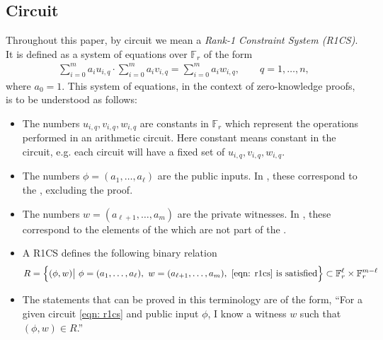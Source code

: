 
\subsection{Circuit}
Throughout this paper, by circuit we mean a \emph{Rank-1 Constraint System (R1CS)}. It is defined as a system of equations over $\mathbb{F}_r$ of the form 
\begin{align}
\sum_{i=0}^m a_i u_{i, q} \cdot \sum_{i=0}^m a_i v_{i, q} = \sum_{i=0}^m a_i w_{i, q}, \qquad q = 1, \dots, n, \label{eqn: r1cs}
\end{align}
where $a_0 = 1$. This system of equations, in the context of zero-knowledge proofs, is to be understood as follows:
\begin{itemize}
\item The numbers $u_{i, q}, v_{i, q}, w_{i, q}$ are constants in $\mathbb{F}_r$ which represent the operations performed in an arithmetic circuit. Here constant means constant in the circuit, e.g. each \MantaPay{} circuit will have a fixed set of $u_{i, q}, v_{i, q}, w_{i, q}$.
\item The numbers $\phi = (a_1, \dots, a_\ell)$ are the public inputs. In \MantaPay{}, these correspond to the \TransferPost{}, excluding the proof.
\item The numbers $w = (a_{\ell + 1}, \dots, a_m)$ are the private witnesses. In \MantaPay{}, these correspond to the elements of the \Transfer{} which are not part of the \TransferPost{}.
\item A R1CS defines the following binary relation
\begin{align}
R = \left\{ (\phi, w) \big| \ \phi = (a_1, \dots, a_\ell), \ w = (a_{\ell + 1}, \dots, a_m), \ \eqref{eqn: r1cs} \textrm{ is satisfied} \right\} \subset \mathbb{F}_r^\ell \times \mathbb{F}_r^{m-\ell}
\end{align}
\item The statements that can be proved in this terminology are of the form,  ``For a given circuit \eqref{eqn: r1cs} and public input $\phi$, I know a witness $w$ such that $(\phi, w) \in R$.''
\end{itemize}


